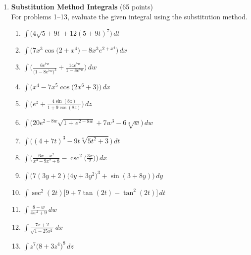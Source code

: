 \begin{enumerate}
  \item \textbf{Substitution Method Integrals} (65 points)\\
  For problems 1--13, evaluate the given integral using the substitution method.
  \begin{enumerate}
    \item $\displaystyle \int \bigl(4 \sqrt{5 + 9 t} + 12(5 + 9 t)^7\bigr) \,dt$
    \item $\displaystyle \int \bigl(7 x^3 \cos\bigl(2 + x^4\bigr) - 8 x^3 e^{2 + x^4}\bigr) \,dx$
    \item $\displaystyle \int \biggl(\frac{6 e^{7 w}}{\bigl(1 - 8 e^{7 w}\bigr)^3} + \frac{14 e^{7 w}}{1 - 8 e^{7 w}}\biggr) \,dw$
    \item $\displaystyle \int \bigl(x^4 - 7 x^5 \cos\bigl(2 x^6 + 3\bigr)\bigr) \,dx$
    \item $\displaystyle \int \biggl(e^z + \frac{4 \sin(8 z)}{1 + 9 \cos(8 z)}\biggr) \,dz$
    \item $\displaystyle \int \bigl(20 e^{2 - 8 w} \sqrt{1 + e^{2 - 8 w}} + 7 w^3 - 6 \sqrt[3]{w}\bigr) \,dw$
    \item $\displaystyle \int \bigl((4 + 7 t)^3 - 9 t \sqrt[4]{5 t^2 + 3}\bigr) \,dt$
    \item $\displaystyle \int \biggl(\frac{6 x - x^2}{x^3 - 9 x^2 + 8} - \csc^2\biggl(\frac{3 x}{2}\biggr)\biggr) \,dx$
    \item $\displaystyle \int \bigl(7(3 y + 2)\bigl(4 y + 3 y^2\bigr)^3 + \sin(3 + 8 y)\bigr) \,dy$
    \item $\displaystyle \int \sec^2(2 t)\bigl[9 + 7 \tan(2 t) - \tan^2(2 t)\bigr] \,dt$
    \item $\displaystyle \int \frac{8 - w}{4 w^2 + 9} \,dw$
    \item $\displaystyle \int \frac{7 x + 2}{\sqrt{1 - 25 x^2}} \,dx$
    \item $\displaystyle \int z^7\bigl(8 + 3 z^4\bigr)^8 \,dz$
  \end{enumerate}
  \begin{subanswer}
  \end{subanswer}


\end{enumerate}
